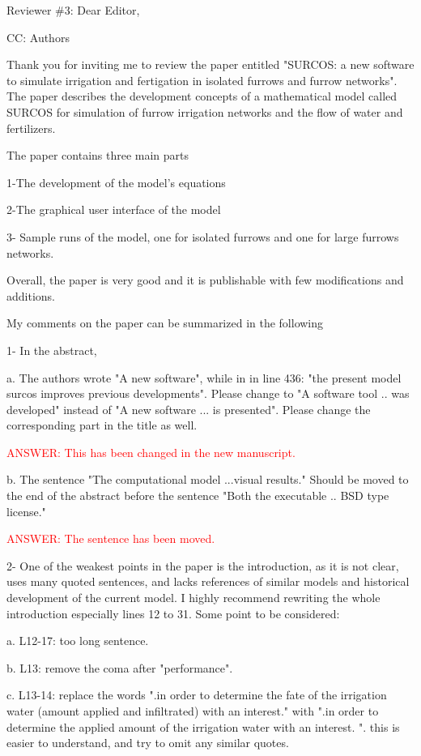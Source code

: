 \documentclass[a4paper]{article}
\begin{document}
Reviewer \#3: Dear Editor,

CC: Authors

Thank you for inviting me to review the paper entitled "SURCOS: a new software to simulate irrigation and fertigation in isolated furrows and furrow networks".
The paper describes the development concepts of a mathematical model called SURCOS for simulation of furrow irrigation networks and the flow of water and fertilizers.

The paper contains three main parts

1-The development of the model's equations

2-The graphical user interface of the model

3- Sample runs of the model, one for isolated furrows and one for large furrows networks.

Overall, the paper is very good and it is publishable with few modifications and additions.

My comments on the paper can be summarized in the following

1- In the abstract,

a. The authors wrote "A new software", while in in line 436: "the present model surcos improves previous developments". Please change to "A software tool .. was developed" instead of "A new software ... is presented". Please change the corresponding part in the title as well.

\textcolor{red}{ANSWER: This has been changed in the new manuscript.}
 
b. The sentence "The computational model ...visual results." Should be moved to the end of the abstract before the sentence "Both the executable .. BSD type license."

\textcolor{red}{ANSWER: The sentence has been moved.}

2- One of the weakest points in the paper is the introduction, as it is not clear, uses many quoted sentences, and lacks references of similar models and historical development of the current model. I highly recommend rewriting the whole introduction especially lines 12 to 31. Some point to be considered:

a. L12-17: too long sentence.

b. L13: remove the coma after "performance".

c. L13-14: replace the words ".in order to determine the fate of the irrigation water (amount applied and infiltrated) with an interest." with ".in order to determine the applied amount of the irrigation water with an interest. ". this is easier to understand, and try to omit any similar quotes.
\end{document}
